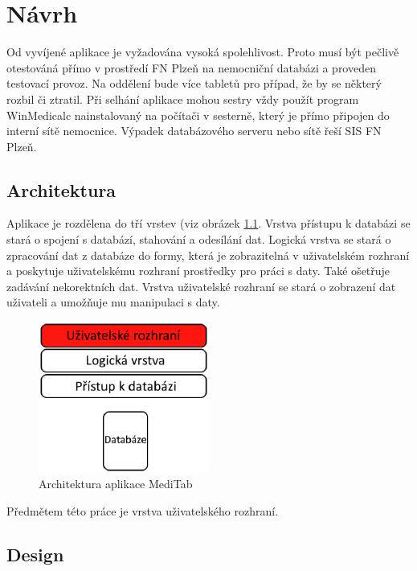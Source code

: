\chapter{Návrh}
\label{ch:navrh}

Od vyvíjené aplikace je vyžadována vysoká spolehlivost. Proto musí být pečlivě otestováná přímo v prostředí FN Plzeň na nemocniční databázi a proveden testovací provoz. Na oddělení bude více tabletů pro případ, že by se některý rozbil či ztratil. Při selhání aplikace mohou sestry vždy použít program WinMedicalc nainstalovaný na počítači v sesterně, který je přímo připojen do interní sítě nemocnice. Výpadek databázového serveru nebo sítě řeší SIS FN Plzeň.

\section{Architektura}

Aplikace je rozdělena do tří vrstev (viz obrázek \ref{fig:architektura}. Vrstva přístupu k databázi se stará o spojení s databází, stahování a odesílání dat. Logická vrstva se stará o zpracování dat z databáze do formy, která je zobrazitelná v uživatelském rozhraní a poskytuje uživatelskému rozhraní prostředky pro práci s daty. Také ošetřuje zadávání nekorektních dat. Vrstva uživatelské rozhraní se stará o zobrazení dat uživateli a umožňuje mu manipulaci s daty.

\begin{figure}[H]
	\centering
	\includegraphics[width=0.5\textwidth]{img/architektura.eps}
	\caption{Architektura aplikace MediTab}
  \label{fig:architektura}
\end{figure}

Předmětem této práce je vrstva uživatelského rozhraní.


\section{Design}

